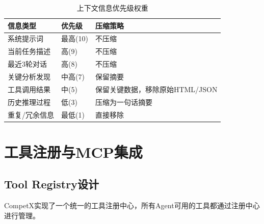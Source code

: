 \documentclass[12pt,a4paper]{ctexrep}
\begin{document}
\begin{table}[H]
\centering
\caption{上下文信息优先级权重}
\label{tab:context-priority}
{\small
\begin{tabular}{p{4cm} p{2cm} p{7cm}}
\toprule
\textbf{信息类型} & \textbf{优先级} & \textbf{压缩策略} \\
\midrule
系统提示词 & 最高(10) & 不压缩 \\
当前任务描述 & 高(9) & 不压缩 \\
最近3轮对话 & 高(8) & 不压缩 \\
关键分析发现 & 中高(7) & 保留摘要 \\
工具调用结果 & 中(5) & 保留关键数据，移除原始HTML/JSON \\
历史推理过程 & 低(3) & 压缩为一句话摘要 \\
重复/冗余信息 & 最低(1) & 直接移除 \\
\bottomrule
\end{tabular}
}
\end{table}

\section{工具注册与MCP集成}

\subsection{Tool Registry设计}

CompetX实现了一个统一的工具注册中心，所有Agent可用的工具都通过注册中心进行管理。
\end{document}
